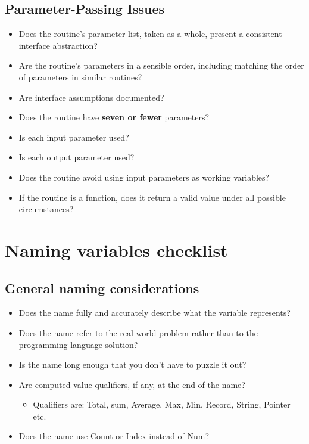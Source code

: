 \subsection{Parameter-Passing Issues}
\begin{itemize}
\item Does the routine's parameter list, taken as a whole, present a consistent interface abstraction? 
\item Are the routine's parameters in a sensible order, including matching the order of parameters in similar routines?
\item Are interface assumptions documented?
\item Does the routine have \textbf{seven or fewer} parameters?
\item Is each input parameter used?
\item Is each output parameter used?
\item Does the routine avoid using input parameters as working variables? 
\item If the routine is a function, does it return a valid value under all possible circumstances?
\end{itemize}

\newpage
\section{Naming variables checklist}
\subsection{General naming considerations}
\begin{itemize}
\item Does the name fully and accurately describe what the variable represents?
\item Does the name refer to the real-world problem rather than to the programming-language solution?
\item Is the name long enough that you don’t have to puzzle it out?
\item Are computed-value qualifiers, if any, at the end of the name? \begin{itemize}
\item Qualifiers are: Total, sum, Average, Max, Min, Record, String, Pointer etc. 
\end{itemize}
\item Does the name use Count or Index instead of Num?
\end{itemize}


